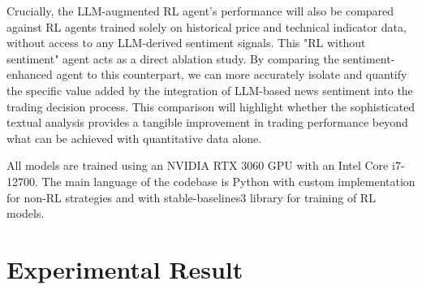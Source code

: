 Crucially, the \gls{LLM}-augmented \gls{RL} agent's performance will also be compared against RL agents trained solely on historical price and technical indicator data, without access to any \gls{LLM}-derived sentiment signals. This "RL without sentiment" agent acts as a direct ablation study. By comparing the sentiment-enhanced agent to this counterpart, we can more accurately isolate and quantify the specific value added by the integration of \gls{LLM}-based news sentiment into the trading decision process. This comparison will highlight whether the sophisticated textual analysis provides a tangible improvement in trading performance beyond what can be achieved with quantitative data alone.

All models are trained using an NVIDIA RTX 3060 GPU with an Intel Core i7-12700. The main language of the codebase is Python with custom implementation for non-\gls{RL} strategies and with stable-baselines3 library for training of \gls{RL} models.
\section{Experimental Result}
